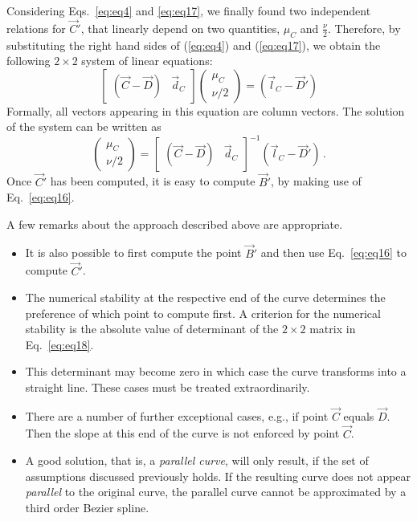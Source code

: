 Considering Eqs.~\ref{eq:eq4} and \ref{eq:eq17}, we finally found two
independent relations for $\vec{C}'$, that linearly depend on two quantities,
$\mu_C$ and $\frac{\nu}{2}$. Therefore, by substituting the right hand sides
of (\ref{eq:eq4}) and (\ref{eq:eq17}), we obtain the following $2 \times
2$ system of linear equations:
\begin{equation}
  \label{eq:eq18}
  \left[ 
    \begin{array}{cc}
      (\vec{C}-\vec{D}) & \vec{d}_C 
    \end{array}
  \right] 
  \left(
    \begin{array}{cc}
      \mu_C \\
      \nu/2
    \end{array}
  \right)
  = \left( \vec{l}_C - \vec{D}' \right)
\end{equation}
Formally, all vectors appearing in this equation are column vectors. The
solution of the system can be written as 
\begin{equation}
  \label{eq:eq19}
  \left(
    \begin{array}{cc}
      \mu_C \\
      \nu/2
    \end{array}
  \right)
  = 
  \left[ 
    \begin{array}{cc}
      (\vec{C}-\vec{D}) & \vec{d}_C 
    \end{array}
  \right]^{-1}
  \left( \vec{l}_C - \vec{D}' \right)\, .
\end{equation}
Once $\vec{C}'$ has been computed, it is easy to compute $\vec{B}'$, by making
use of Eq.~\ref{eq:eq16}.

A few remarks about the approach described above are appropriate.
\begin{itemize}
\item It is also possible to first compute the point $\vec{B}'$ and then use
  Eq.~\ref{eq:eq16} to compute $\vec{C}'$.
\item The numerical stability at the respective end of the curve determines
  the preference of which point to compute first. A criterion for the
  numerical stability is the absolute value of determinant of the $2 \times 2$
  matrix in Eq.~\ref{eq:eq18}.  
\item This determinant may become zero in which case the curve transforms into
  a straight line. These cases must be treated extraordinarily.
\item There are a number of further exceptional cases, e.g., if point $\vec{C}$
  equals $\vec{D}$. Then the slope at this end of the curve is not enforced by
  point $\vec{C}$.
\item A good solution, that is, a {\em parallel curve}, will only result, if
  the set of assumptions discussed previously holds. If the resulting curve
  does not appear {\em parallel} to the original curve, the parallel curve
  cannot be approximated by a third order Bezier spline.
\end{itemize}



